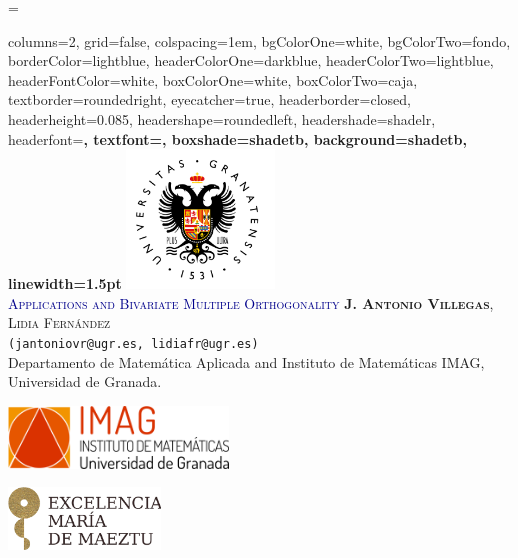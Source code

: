 \documentclass[portrait,final,a0paper,fontscale=0.38]{baposter}
\begin{document}
\emergencystretch=\maxdimen
{}
\begin{poster}%
  {
  columns=2,
  grid=false,
  colspacing=1em,
  bgColorOne=white,
  bgColorTwo=fondo,
  borderColor=lightblue,
  headerColorOne=darkblue,
  headerColorTwo=lightblue,
  headerFontColor=white,
  boxColorOne=white,
  boxColorTwo=caja,
 textborder=roundedright,
  eyecatcher=true,
  headerborder=closed,
  headerheight=0.085\textheight,
  headershape=roundedleft,
  headershade=shadelr,
  headerfont=\Large\bf\textsc, %
  textfont={\setlength{\parindent}{1.5em}},
  boxshade=shadetb,
  background=shadetb,
  linewidth=1.5pt
  }
  {
  	\includegraphics[height=10em]{ugr}
  }
  {
  	\medskip
  	{\scalebox{1.4}{\LARGE{\bf\textsc{\textcolor{darkblue}{Orthogonal Polynomials}}}}}\\
    {\LARGE \textsc{\textcolor{darkblue}{Applications and Bivariate Multiple Orthogonality}}}\vspace{3pt}
  }
  {
  	\textsc{\textbf{J. Antonio Villegas}, Lidia Fernández}
  	\\
  	\small{\texttt{(jantoniovr@ugr.es, lidiafr@ugr.es)}}
  	\\
  	\normalsize{Departamento de Matem\'{a}tica Aplicada and Instituto de Matemáticas IMAG, Universidad de Granada.}
  }
  {
  	\includegraphics[height=4.5em]{IMAG}
    
  	\includegraphics[height=4.5em]{maeztu}
  }




\end{poster}
\end{document}
